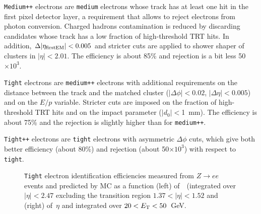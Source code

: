 \texttt{Medium++} electrons are \texttt{medium} electrons whose track has at least one hit in the
first pixel detector layer, a requirement that allows to reject electrons from
photon conversion. Charged hadrons contamination is reduced by discarding candidates
whose track has a low fraction of high-threshold TRT hits. In addition, $\Delta|\eta_{\rm first EM}|<0.005$ 
and stricter cuts are applied to shower shaper of clusters in $|\eta|<2.01$. The
efficiency is about 85\% and rejection is a bit less 50$\times 10^3$.

\texttt{Tight} electrons are \texttt{medium++} electrons with additional requirements on the distance
between the track and the matched cluster ($|\Delta\phi|<0.02$, $|\Delta\eta|<0.005$) and on the $E/p$
variable. Stricter cuts are imposed on the fraction of high-threshold TRT hits and on the impact parameter
($|d_0|<$1~mm). The efficiency is about 75\% and the rejection is slightly higher than 
for \texttt{medium++}.

\texttt{Tight++} electrons are \texttt{tight} electrons with asymmetric $\Delta\phi$ cuts, which give
both better efficiency (about 80\%) and rejection (about 50$\times 10^3$) with respect to \texttt{tight}.

\begin{figure}[tb]\begin{center}
	\caption{\texttt{Tight} electron identification efficiencies measured from $Z\to ee$ events and predicted by MC as a function (left) of~\ET\ (integrated over $|\eta|< 2.47$ excluding the transition region $1.37< |\eta|<1.52$ and (right) of~$\eta$ and integrated over $20< \ET<50$~GeV.~\cite{eperf}\label{fig:eleeff}}
\end{center}\end{figure}

